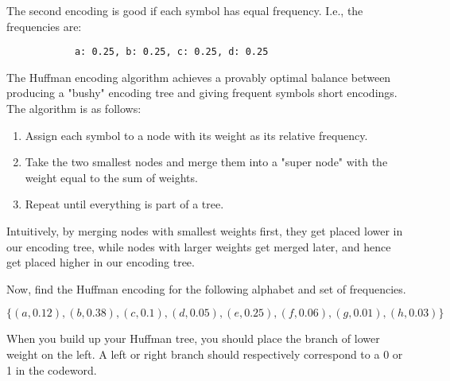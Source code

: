 \begin{parts}
\begin{solution}[2in]
        The second encoding is good if each symbol has equal frequency. I.e., the frequencies are:
        \begin{lstlisting}
            a: 0.25, b: 0.25, c: 0.25, d: 0.25
        \end{lstlisting}
    \end{solution}

    \pagebreak
    \item The Huffman encoding algorithm achieves a provably optimal balance between producing a "bushy" encoding tree and giving frequent symbols short encodings. The algorithm is as follows:

    \begin{enumerate}
        \item Assign each symbol to a node with its weight as its relative frequency.
        \item Take the two smallest nodes and merge them into a "super node" with the weight equal to the sum of weights.
        \item Repeat until everything is part of a tree.
    \end{enumerate}

    Intuitively, by merging nodes with smallest weights first, they get placed lower in our encoding tree, while nodes with larger weights get merged later, and hence get placed higher in our encoding tree.

    Now, find the Huffman encoding for the following alphabet and set of
    frequencies.
    
    $\{(a, 0.12), (b, 0.38), (c, 0.1), (d, 0.05), (e, 0.25), (f, 0.06), (g, 0.01), (h, 0.03)\}$
    
    When you build up your Huffman tree, you should place the branch of lower
    weight on the left. A left or right branch should respectively correspond to a
    0 or 1 in the codeword.


\end{parts}
